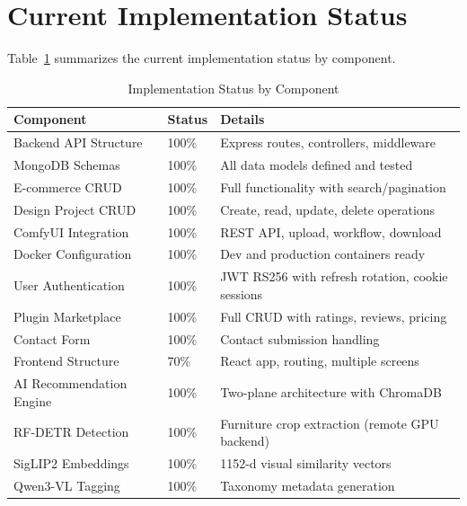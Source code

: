 \section{Current Implementation Status}
\label{sec:current_status}

Table~\ref{tab:impl_summary} summarizes the current implementation status by component.

\begin{table}[htbp]
    \centering
    \caption{Implementation Status by Component}
    \label{tab:impl_summary}
    \begin{tabularx}{\textwidth}{|p{4cm}|p{2cm}|X|}
        \hline
        \textbf{Component} & \textbf{Status} & \textbf{Details} \\
        \hline
        Backend API Structure & 100\% & Express routes, controllers, middleware \\
        \hline
        MongoDB Schemas & 100\% & All data models defined and tested \\
        \hline
        E-commerce CRUD & 100\% & Full functionality with search/pagination \\
        \hline
        Design Project CRUD & 100\% & Create, read, update, delete operations \\
        \hline
        ComfyUI Integration & 100\% & REST API, upload, workflow, download \\
        \hline
        Docker Configuration & 100\% & Dev and production containers ready \\
        \hline
        User Authentication & 100\% & JWT RS256 with refresh rotation, cookie sessions \\
        \hline
        Plugin Marketplace & 100\% & Full CRUD with ratings, reviews, pricing \\
        \hline
        Contact Form & 100\% & Contact submission handling \\
        \hline
        Frontend Structure & 70\% & React app, routing, multiple screens \\
        \hline
        AI Recommendation Engine & 100\% & Two-plane architecture with ChromaDB \\
        \hline
        RF-DETR Detection & 100\% & Furniture crop extraction (remote GPU backend) \\
        \hline
        SigLIP2 Embeddings & 100\% & 1152-d visual similarity vectors \\
        \hline
        Qwen3-VL Tagging & 100\% & Taxonomy metadata generation \\

\end{tabularx}
\end{table}
